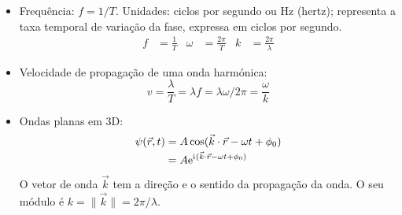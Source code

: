 \begin{itemize}
\begin{center}
    \end{center}
  \item Frequência: $f=1/T$. Unidades: ciclos por segundo ou Hz (hertz);
    representa a taxa temporal de variação da fase, expressa em ciclos por
    segundo.
    \begin{align*}
      f&=\frac{1}{T}&\omega&=\frac{2\pi}{T}&k&=\frac{2\pi}{\lambda}
    \end{align*}
\item Velocidade de propagação de uma onda harmónica:
\begin{equation*}
v=\frac{\lambda}{T}=\lambda f=\lambda \omega/2\pi=\frac\omega k
\end{equation*}
\item Ondas planas em 3D:
  \begin{align*}
    \psi(\vec r,t)&=A\cos(\vec k\cdot \vec r-\omega t+\phi_0)\\
                  &=A\e^{\iu(\vec k\cdot \vec r-\omega t+\phi_0)}
  \end{align*}
  O vetor de onda $\vec k$ tem a direção e o sentido da propagação da onda. O
  seu módulo é $k=\|\vec k\|=2\pi/\lambda$.

\end{itemize}

